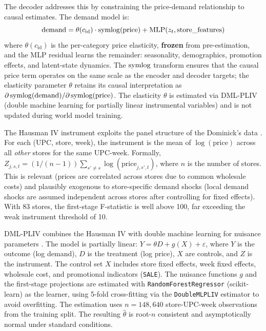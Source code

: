 The \dreamprice{} decoder addresses this by constraining the price-demand relationship to causal estimates. The demand model is:
\begin{equation}
\text{demand} = \theta(c_{\text{id}}) \cdot \operatorname{symlog}(\text{price}) + \text{MLP}(z_t, \text{store\_features})
\end{equation}
where $\theta(c_{\text{id}})$ is the per-category price elasticity, \textbf{frozen} from pre-estimation, and the MLP residual learns the remainder: seasonality, demographics, promotion effects, and latent-state dynamics. The $\operatorname{symlog}$ transform ensures that the causal price term operates on the same scale as the encoder and decoder targets; the elasticity parameter $\theta$ retains its causal interpretation as $\partial \operatorname{symlog}(\text{demand}) / \partial \operatorname{symlog}(\text{price})$. The elasticity $\theta$ is estimated via DML-PLIV (double machine learning for partially linear instrumental variables) \citep{chernozhukov2018dml} and is not updated during world model training.

The Hausman IV instrument exploits the panel structure of the Dominick's data \citep{dominicks1999}. For each (UPC, store, week), the instrument is the mean of $\log(\text{price})$ across all \emph{other} stores for the same UPC-week. Formally, $Z_{j,s,t} = (1/(n-1)) \sum_{s' \neq s} \log(\text{price}_{j,s',t})$, where $n$ is the number of stores. This is relevant (prices are correlated across stores due to common wholesale costs) and plausibly exogenous to store-specific demand shocks (local demand shocks are assumed independent across stores after controlling for fixed effects). With 83 stores, the first-stage F-statistic is well above 100, far exceeding the weak instrument threshold of 10.

DML-PLIV combines the Hausman IV with double machine learning for nuisance parameters \citep{chernozhukov2018dml}. The model is partially linear: $Y = \theta D + g(X) + \varepsilon$, where $Y$ is the outcome (log demand), $D$ is the treatment (log price), $X$ are controls, and $Z$ is the instrument. The control set $X$ includes store fixed effects, week fixed effects, wholesale cost, and promotional indicators (\texttt{SALE}). The nuisance functions $g$ and the first-stage projections are estimated with \texttt{RandomForestRegressor} (scikit-learn) as the learner, using 5-fold cross-fitting via the \texttt{DoubleMLPLIV} estimator to avoid overfitting. The estimation uses $n = 148{,}640$ store-UPC-week observations from the training split. The resulting $\hat{\theta}$ is root-$n$ consistent and asymptotically normal under standard conditions.

